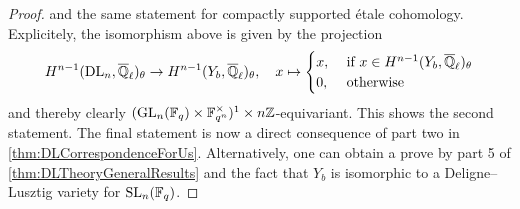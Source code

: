 \documentclass[../main.tex]{subfiles}
\begin{document}
\begin{lem}
\begin{proof}
  and the same statement for compactly supported \'etale cohomology. 
  Explicitely, the isomorphism above is given by the projection
    \begin{equation*}
      H^{n-1}(\mathrm{DL}_n, {\overline {\mathbb{Q}}_\ell})_\theta \to H^{n-1}(Y_b, {\overline {\mathbb{Q}}_\ell})_\theta ,
      \quad x \mapsto \begin{cases}
        x, &\text{ if }x \in H^{n-1}(Y_b, {\overline {\mathbb{Q}}_\ell})_\theta \\
        0, &\text{ otherwise}
      \end{cases}
    \end{equation*}
    and thereby clearly $(\operatorname{GL}_n(\mathbb{F}_q) \times \mathbb{F}_{q^n}^\times)^1 \times
    n\mathbb{Z}$-equivariant. This shows the second statement.
    The final statement is now a direct consequence of part two in 
    \cref{thm:DLCorrespondenceForUs}. Alternatively, one can obtain a prove by
    part 5 of \cref{thm:DLTheoryGeneralResults} and the fact that $Y_b$ is isomorphic
    to a Deligne--Lusztig variety for $\operatorname{SL}_n(\mathbb{F}_q)$.
\end{proof}
\end{lem}


\end{document}
